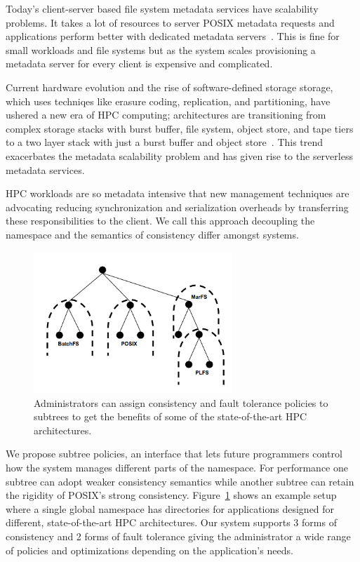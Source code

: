 \documentclass[preprint]{sigplanconf-eurosys}
\begin{document}
Today's client-server based file system metadata services have scalability
problems. It takes a lot of resources to server POSIX metadata requests and
applications perform better with dedicated metadata
servers~\cite{sevilla:sc15-mantle, ren:sc2014-indexfs}. This is fine for small
workloads and file systems but as the system scales provisioning a metadata
server for every client is expensive and complicated.

Current hardware evolution and the rise of software-defined storage storage,
which uses techniqes like erasure coding, replication, and partitioning, have
ushered a new era of HPC computing; architectures are transitioning from
complex storage stacks with burst buffer, file system, object store, and tape
tiers to a two layer stack with just a burst buffer and object
store~\cite{bent:login16-hpc-trends}. This trend exacerbates the metadata
scalability problem and has given rise to the serverless metadata services.

HPC workloads are so metadata intensive that new management techniques are
advocating reducing synchronization and serialization overheads by transferring
these responsibilities to the client. We call this approach decoupling the
namespace and the semantics of consistency differ amongst systems.

\begin{figure}[tb]
\centering
\includegraphics[width=75mm]{figures/subtree-policies.png}
\caption{Administrators can assign consistency and fault tolerance policies to
subtrees to get the benefits of some of the state-of-the-art HPC architectures.
}\label{fig:subtree-policies}
\end{figure}

We propose subtree policies, an interface that lets future programmers control
how the system manages different parts of the namespace.  For performance one
subtree can adopt weaker consistency semantics while another subtree can retain
the rigidity of POSIX's strong consistency. Figure~\ref{fig:subtree-policies}
shows an example setup where a single global namespace has directories for
applications designed for different, state-of-the-art HPC architectures.  Our
system supports 3 forms of consistency and 2 forms of fault tolerance giving
the administrator a wide range of policies and optimizations depending on the
application's needs.
\end{document}
